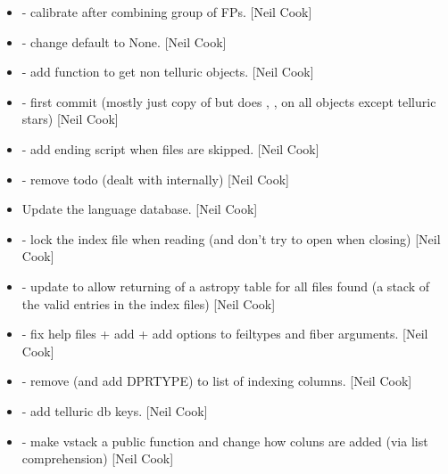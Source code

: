 \documentclass[a4paper,10pt,english]{report}
\begin{document}
\begin{itemize}
\item {} 
 - calibrate after combining group of FPs. {[}Neil
Cook{]}

\item {} 
 - change default to
None. {[}Neil Cook{]}

\item {} 
 - add function  to get non
telluric objects. {[}Neil Cook{]}

\item {} 
 - first commit (mostly just
copy of  but does , ,
 on all objects except telluric stars) {[}Neil Cook{]}

\item {} 
 - add ending script when files
are skipped. {[}Neil Cook{]}

\item {} 
 - remove todo (dealt with
internally) {[}Neil Cook{]}

\item {} 
Update the language database. {[}Neil Cook{]}

\item {} 
 - lock the index file when reading (and don’t try
to open when closing) {[}Neil Cook{]}

\item {} 
 - update  to allow returning of a astropy
table for all files found (a stack of the valid entries in the index
files) {[}Neil Cook{]}

\item {} 
 - fix help files + add
 + add options to feiltypes and fiber arguments. {[}Neil
Cook{]}

\item {} 
 - remove  (and add
DPRTYPE) to list of indexing columns. {[}Neil Cook{]}

\item {} 
 - add telluric db keys. {[}Neil Cook{]}

\item {} 
 - make vstack a public function and change how
coluns are added (via list comprehension) {[}Neil Cook{]}

\end{itemize}
\end{document}
